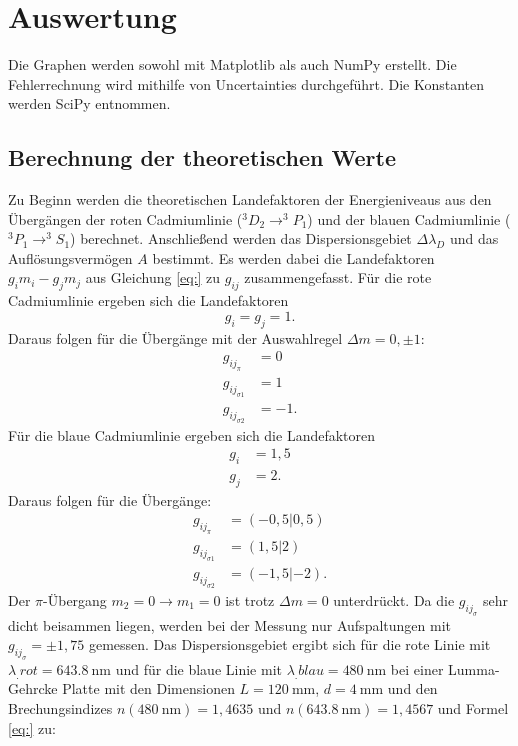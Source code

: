 \section{Auswertung}
\label{sec:Auswertung}

Die Graphen werden sowohl mit Matplotlib \cite{matplotlib} als auch NumPy \cite{numpy} erstellt. Die Fehlerrechnung wird mithilfe von Uncertainties \cite{uncertainties} durchgeführt. Die Konstanten werden SciPy \cite{scipy} entnommen.

\subsection{Berechnung der theoretischen Werte}

Zu Beginn werden die theoretischen Landefaktoren der Energieniveaus aus den Übergängen der roten Cadmiumlinie ($^3D_2 \rightarrow^3P_1$) und der blauen Cadmiumlinie ($^3P_1 \rightarrow^3S_1$) berechnet. 
Anschließend werden das Dispersionsgebiet $\Delta\lambda_D$ und das Auflösungsvermögen $A$ bestimmt.
Es werden dabei die Landefaktoren $g_im_i-g_jm_j$ aus Gleichung \ref{eq:} zu $g_{ij}$ zusammengefasst.
Für die rote Cadmiumlinie ergeben sich die Landefaktoren
\[
g_i=g_j=1\text{.}
\]
Daraus folgen für die Übergänge mit der Auswahlregel $\Delta m=0,\pm 1$:
\begin{align*}
g_{ij_\pi}&=0\\
g_{ij_{\sigma1}}&=1\\
g_{ij_{\sigma2}}&=-1 \text{.}
\end{align*}
Für die blaue Cadmiumlinie ergeben sich die Landefaktoren
\begin{align*}
g_i &= 1,5\\
g_j &= 2 \text{.}
\end{align*}
Daraus folgen für die Übergänge:
\begin{align*}
g_{ij_\pi}&=(-0,5|0,5)\\
g_{ij_{\sigma1}}&=(1,5|2)\\
g_{ij_{\sigma2}}&=(-1,5|-2) \text{.}
\end{align*}
Der $\pi$-Übergang $m_2=0\rightarrow m_1=0$ ist trotz $\Delta m=0$ unterdrückt.
Da die $g_{ij_{\sigma}}$ sehr dicht beisammen liegen, werden bei der Messung nur Aufspaltungen mit $g_{ij_\sigma} = \pm 1,75$ gemessen.
Das Dispersionsgebiet ergibt sich für die rote Linie mit $\lambda_.{rot}=\SI{643.8}{\nano\metre}$ und für die blaue Linie mit $\lambda_.{blau}=\SI{480}{\nano\metre}$ bei einer Lumma-Gehrcke Platte mit den Dimensionen $L=\SI{120}{\milli\metre}$, $d=\SI{4}{\milli\metre}$ und den Brechungsindizes $n(\SI{480}{\nano\metre})=1,4635$ und $n(\SI{643.8}{\nano\metre})=1,4567$ und Formel \eqref{eq:} zu:
